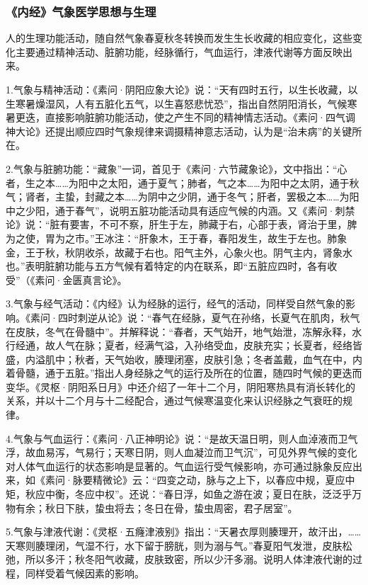 \documentclass[draft,12pt]{ctexbook}
\begin{document}
\subsubsection{《内经》气象医学思想与生理}%

人的生理功能活动，随自然气象春夏秋冬转换而发生生长收藏的相应变化，这些变化主要通过精神活动、脏腑功能，经脉循行，气血运行，津液代谢等方面反映出来。

1.气象与精神活动：《素问·阴阳应象大论》说：“天有四时五行，以生长收藏，以生寒暑燥湿风，人有五脏化五气，以生喜怒悲忧恐”，指出自然阴阳消长，气候寒暑更迭，直接影响脏腑功能活动，使之产生不同的精神情志活动。《素问·四气调神大论》还提出顺应四时气象规律来调摄精神意志活动，认为是“治未病”的关键所在。

2.气象与脏腑功能：“藏象”一词，首见于《素问·六节藏象论》，文中指出：“心者，生之本……为阳中之太阳，通于夏气；肺者，气之本……为阳中之太阴，通于秋气；肾者，主蛰，封藏之本……为阴中之少阴，通于冬气；肝者，罢极之本……为阳中之少阳，通于春气”，说明五脏功能活动具有适应气候的内涵。又《素问·刺禁论》说：“脏有要害，不可不察，肝生于左，肺藏于右，心部于表，肾治于里，脾为之使，胃为之市。”王冰注：“肝象木，王于春，春阳发生，故生于左也。肺象金，王于秋，秋阴收杀，故藏于右也。阳气主外，心象火也。阴气主内，肾象水也。”表明脏腑功能与五方气候有着特定的内在联系，即“五脏应四时，各有收受”（《素问·金匮真言论》。

3.气象与经气活动：《内经》认为经脉的运行，经气的活动，同样受自然气象的影响。《素问·四时刺逆从论》说：“春气在经脉，夏气在孙络，长夏气在肌肉，秋气在皮肤，冬气在骨髓中”。并解释说：“春者，天气始开，地气始泄，冻解永释，水行经通，故人气在脉；夏者，经满气溢，入孙络受血，皮肤充实；长夏者，经络皆盛，内溢肌中；秋者，天气始收，腠理闭塞，皮肤引急；冬者盖戴，血气在中，内着骨髓，通于五脏。”指出人身经脉之气的运行及所在的位置，随四时气候的更迭而变华。《灵枢·阴阳系日月》中还介绍了一年十二个月，阴阳寒热具有消长转化的关系，并以十二个月与十二经配合，通过气候寒温变化来认识经脉之气衰旺的规律。

4.气象与气血运行：《素问·八正神明论》说：“是故天温日明，则人血淖液而卫气浮，故血易泻，气易行；天寒日阴，则人血凝泣而卫气沉”，可见外界气候的变化对人体气血运行的状态影响是显著的。气血运行受气候影响，亦可通过脉象反应出来，如《素问·脉要精微论》云：“四变之动，脉与之上下，以春应中规，夏应中矩，秋应中衡，冬应中权”。还说：“春日浮，如鱼之游在波；夏日在肤，泛泛乎万物有余；秋日下肤，蛰虫将去；冬日在骨，蛰虫周密，君子居室”。

5.气象与津液代谢：《灵枢·五癃津液别》指出：“天暑衣厚则腠理开，故汗出，……天寒则腠理闭，气湿不行，水下留于膀胱，则为溺与气。”春夏阳气发泄，皮肤松弛，所以多汗；秋冬阳气收藏，皮肤致密，所以少汗多溺。说明人体津液代谢的过程，同样受着气候因素的影响。
\end{document}
